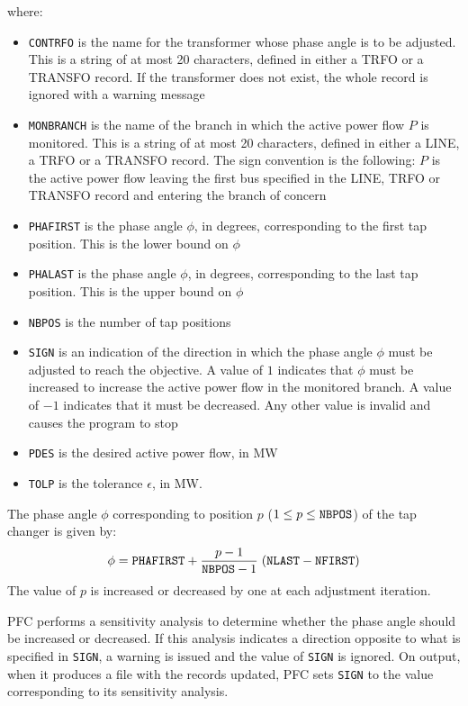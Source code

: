 where:
\begin{itemize}
\item {\tt CONTRFO} is the name for the transformer whose phase angle is to be adjusted. This is a string of at most 20 characters, defined in either a TRFO or a TRANSFO record. If the transformer does
not exist, the whole record is ignored with a warning message
\item {\tt MONBRANCH} is the name of the branch in which the active power flow $P$ is
monitored. This is a string of at most 20 characters, defined in either a LINE, a TRFO or a TRANSFO record.  The sign convention is the following: $P$ is the active power flow leaving the first bus specified in the LINE, TRFO or TRANSFO record and entering the branch of concern
\item {\tt PHAFIRST} is the phase angle $\phi$, in degrees, corresponding to the first tap position. This is the lower bound on $\phi$
\item {\tt PHALAST} is the phase angle $\phi$, in degrees, corresponding to the last tap position. This is the upper bound on $\phi$
\item {\tt NBPOS} is the number of tap positions
\item {\tt SIGN} is an indication of the direction in which the phase angle $\phi$ must be adjusted to reach the objective. A value of $1$ indicates that $\phi$ must be increased to increase the active power flow in the monitored branch. A value of $-1$ indicates that it must be decreased. Any other value is invalid and causes the program to stop
\item {\tt PDES} is the desired active power flow, in MW
\item {\tt TOLP} is the tolerance $\epsilon$, in MW.
\end{itemize}

The phase angle $\phi$ corresponding to position $p$ ($1 \le p \le {\tt NBPOS}$) of the tap changer is given by:
\begin{equation}\label{equ-pf-phivalue}
\phi = {\tt PHAFIRST} + \frac{p-1}{{\tt NBPOS}-1} \; ({\tt NLAST} - {\tt NFIRST})
\end{equation}
The value of $p$ is increased or decreased by one at each adjustment iteration.

PFC performs a sensitivity analysis to determine whether the phase angle should be increased or decreased. If this analysis indicates a direction opposite to what is specified in {\tt SIGN}, a warning is issued and the value of {\tt SIGN} is ignored. On output, when it produces a file with the records updated, PFC sets {\tt SIGN} to the value corresponding to its sensitivity analysis.

